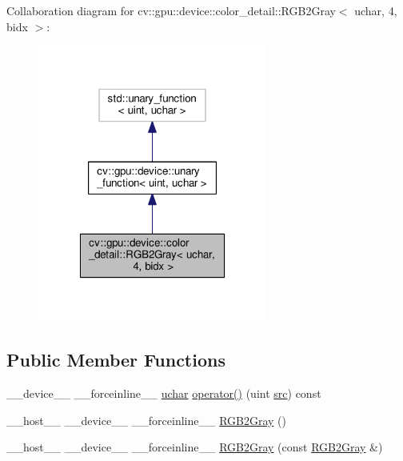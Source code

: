 Collaboration diagram for cv\-:\-:gpu\-:\-:device\-:\-:color\-\_\-detail\-:\-:R\-G\-B2\-Gray$<$ uchar, 4, bidx $>$\-:\nopagebreak
\begin{figure}[H]
\begin{center}
\leavevmode
\includegraphics[width=214pt]{structcv_1_1gpu_1_1device_1_1color__detail_1_1RGB2Gray_3_01uchar_00_014_00_01bidx_01_4__coll__graph}
\end{center}
\end{figure}
\subsection*{Public Member Functions}
\begin{DoxyCompactItemize}
\item 
\-\_\-\-\_\-device\-\_\-\-\_\- \-\_\-\-\_\-forceinline\-\_\-\-\_\- \hyperlink{core_2types__c_8h_a65f85814a8290f9797005d3b28e7e5fc}{uchar} \hyperlink{structcv_1_1gpu_1_1device_1_1color__detail_1_1RGB2Gray_3_01uchar_00_014_00_01bidx_01_4_a84371240461f732e01d57c92bbb08082}{operator()} (uint \hyperlink{legacy_8hpp_a371cd109b74033bc4366f584edd3dacc}{src}) const 
\item 
\-\_\-\-\_\-host\-\_\-\-\_\- \-\_\-\-\_\-device\-\_\-\-\_\- \-\_\-\-\_\-forceinline\-\_\-\-\_\- \hyperlink{structcv_1_1gpu_1_1device_1_1color__detail_1_1RGB2Gray_3_01uchar_00_014_00_01bidx_01_4_a849be856067adeff6e48056bbc609bb8}{R\-G\-B2\-Gray} ()
\item 
\-\_\-\-\_\-host\-\_\-\-\_\- \-\_\-\-\_\-device\-\_\-\-\_\- \-\_\-\-\_\-forceinline\-\_\-\-\_\- \hyperlink{structcv_1_1gpu_1_1device_1_1color__detail_1_1RGB2Gray_3_01uchar_00_014_00_01bidx_01_4_aa3afd1279b40c226507c73d5f6b0d134}{R\-G\-B2\-Gray} (const \hyperlink{structcv_1_1gpu_1_1device_1_1color__detail_1_1RGB2Gray}{R\-G\-B2\-Gray} \&)
\end{DoxyCompactItemize}


